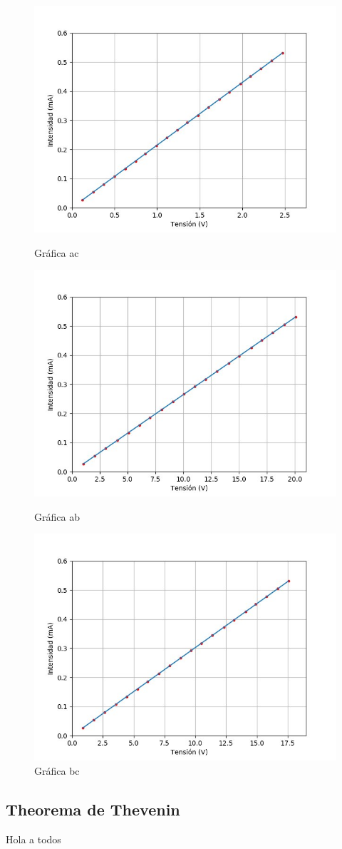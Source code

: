 \documentclass[a4paper,11pt]{article}
\begin{document}
\begin{figure}[hbtp]
\centering
\includegraphics[scale=0.5]{Imagenes/Grafica_ac.jpg}
\caption{Gráfica ac}
\includegraphics[scale=0.5]{Imagenes/Grafica_ab.jpg}
\caption{Gráfica ab}
\includegraphics[scale=0.5]{Imagenes/Grafica_bc.jpg}
\caption{Gráfica bc}
\end{figure}

\subsection{Theorema de Thevenin}
Hola a todos
\end{document}
